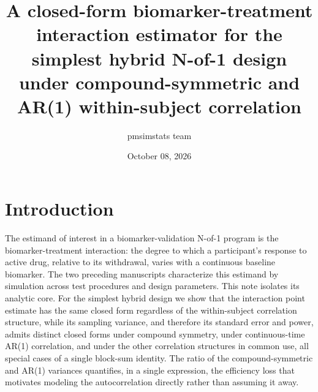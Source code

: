 \documentclass[
  11pt,
]{article}
\title{A closed-form biomarker-treatment interaction estimator for the simplest hybrid N-of-1 design under compound-symmetric and AR(1) within-subject correlation}
\author{pmsimstats team}
\date{October 08, 2026}
\begin{document}
\maketitle

{
\setcounter{tocdepth}{2}
\tableofcontents
}
\section{Introduction}\label{introduction}

The estimand of interest in a biomarker-validation N-of-1 program is
the biomarker-treatment interaction: the degree to which a
participant's response to active drug, relative to its withdrawal,
varies with a continuous baseline biomarker. The two preceding
manuscripts characterize this estimand by simulation across test
procedures and design parameters. This note isolates its analytic
core. For the simplest hybrid design we show that the interaction
point estimate has the same closed form regardless of the
within-subject correlation structure, while its sampling variance, and
therefore its standard error and power, admits distinct closed forms
under compound symmetry, under continuous-time AR(1) correlation, and
under the other correlation structures in common use, all special
cases of a single block-sum identity. The ratio of the
compound-symmetric and AR(1) variances quantifies, in a single
expression,
the efficiency loss that motivates modeling the autocorrelation
directly rather than assuming it away.
\end{document}
